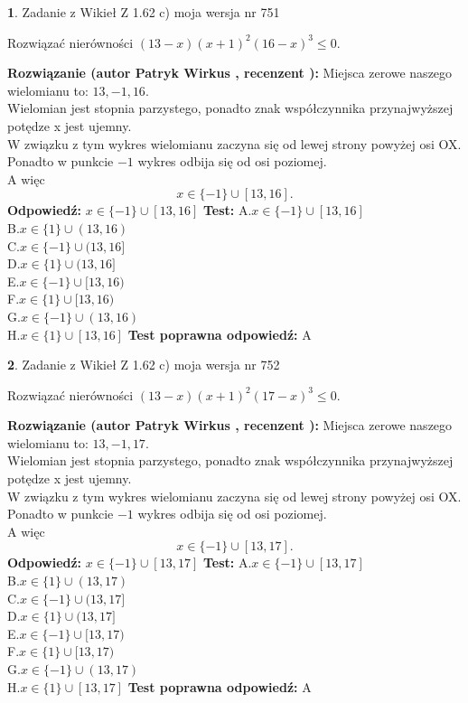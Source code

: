 \documentclass[12pt, a4paper]{article}
\theoremstyle{definition} %
\newtheorem{zad}{}
\newcommand{\zadStart}[1]{\begin{zad}#1\newline}
\newcommand{\zadStop}{\end{zad}}
\newcommand{\rozwStart}[2]{\noindent \textbf{Rozwiązanie (autor #1 , recenzent #2): }\newline}
\newcommand{\rozwStop}{\newline}
\newcommand{\odpStart}{\noindent \textbf{Odpowiedź:}\newline}
\newcommand{\odpStop}{\newline}
\newcommand{\testStart}{\noindent \textbf{Test:}\newline}
\newcommand{\testStop}{\newline}
\newcommand{\kluczStart}{\noindent \textbf{Test poprawna odpowiedź:}\newline}
\newcommand{\kluczStop}{\newline}
\begin{document}
\zadStart{Zadanie z Wikieł Z 1.62 c) moja wersja nr 751}

Rozwiązać nierówności $(13-x)(x+1)^{2}(16-x)^{3}\le0$.
\zadStop
\rozwStart{Patryk Wirkus}{}
Miejsca zerowe naszego wielomianu to: $13, -1, 16$.\\
Wielomian jest stopnia parzystego, ponadto znak współczynnika przy\linebreak najwyższej potędze x jest ujemny.\\ W związku z tym wykres wielomianu zaczyna się od lewej strony powyżej osi OX.\\
Ponadto w punkcie $-1$ wykres odbija się od osi poziomej.\\
A więc $$x \in \{-1\} \cup [13,16].$$
\rozwStop
\odpStart
$x \in \{-1\} \cup [13,16]$
\odpStop
\testStart
A.$x \in \{-1\} \cup [13,16]$\\
B.$x \in \{1\} \cup (13,16)$\\
C.$x \in \{-1\} \cup (13,16]$\\
D.$x \in \{1\} \cup (13,16]$\\
E.$x \in \{-1\} \cup [13,16)$\\
F.$x \in \{1\} \cup [13,16)$\\
G.$x \in \{-1\} \cup (13,16)$\\
H.$x \in \{1\} \cup [13,16]$
\testStop
\kluczStart
A
\kluczStop



\zadStart{Zadanie z Wikieł Z 1.62 c) moja wersja nr 752}

Rozwiązać nierówności $(13-x)(x+1)^{2}(17-x)^{3}\le0$.
\zadStop
\rozwStart{Patryk Wirkus}{}
Miejsca zerowe naszego wielomianu to: $13, -1, 17$.\\
Wielomian jest stopnia parzystego, ponadto znak współczynnika przy\linebreak najwyższej potędze x jest ujemny.\\ W związku z tym wykres wielomianu zaczyna się od lewej strony powyżej osi OX.\\
Ponadto w punkcie $-1$ wykres odbija się od osi poziomej.\\
A więc $$x \in \{-1\} \cup [13,17].$$
\rozwStop
\odpStart
$x \in \{-1\} \cup [13,17]$
\odpStop
\testStart
A.$x \in \{-1\} \cup [13,17]$\\
B.$x \in \{1\} \cup (13,17)$\\
C.$x \in \{-1\} \cup (13,17]$\\
D.$x \in \{1\} \cup (13,17]$\\
E.$x \in \{-1\} \cup [13,17)$\\
F.$x \in \{1\} \cup [13,17)$\\
G.$x \in \{-1\} \cup (13,17)$\\
H.$x \in \{1\} \cup [13,17]$
\testStop
\kluczStart
A
\kluczStop
\end{document}
